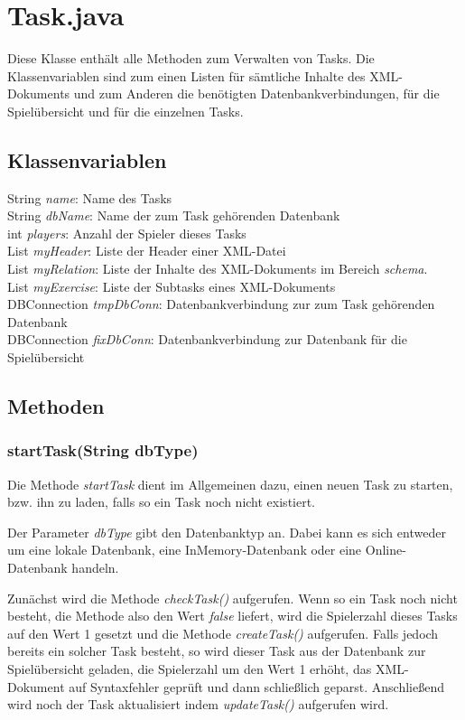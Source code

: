 \documentclass[11pt]{report}
\begin{document}
\section{Task.java}

Diese Klasse enthält alle Methoden zum Verwalten von Tasks. Die Klassenvariablen sind zum einen Listen für sämtliche Inhalte des XML-Dokuments und zum Anderen die benötigten Datenbankverbindungen, für die Spielübersicht und für die einzelnen Tasks.

\subsection*{Klassenvariablen}
String \textit{name}: Name des Tasks \\
String \textit{dbName}: Name der zum Task gehörenden Datenbank \\
int \textit{players}: Anzahl der Spieler dieses Tasks \\
List \textit{myHeader}: Liste der Header einer XML-Datei \\
List \textit{myRelation}: Liste der Inhalte des XML-Dokuments im Bereich \textit{schema}. \\
List \textit{myExercise}: Liste der Subtasks eines XML-Dokuments \\
DBConnection \textit{tmpDbConn}: Datenbankverbindung zur zum Task gehörenden Datenbank \\
DBConnection \textit{fixDbConn}: Datenbankverbindung zur Datenbank für die Spielübersicht

\subsection*{Methoden}

\subsubsection*{startTask(String dbType)}	

Die Methode \textit{startTask} dient im Allgemeinen dazu, einen neuen Task zu starten, bzw. ihn zu laden, falls so ein Task noch nicht existiert.

Der Parameter \textit{dbType} gibt den Datenbanktyp an. Dabei kann es sich entweder um eine lokale Datenbank, eine InMemory-Datenbank oder eine Online-Datenbank handeln.

Zunächst wird die Methode \textit{checkTask()} aufgerufen. Wenn so ein Task noch nicht besteht, die Methode also den Wert \textit{false} liefert, wird die Spielerzahl dieses Tasks auf den Wert 1 gesetzt und die Methode \textit{createTask()} aufgerufen. Falls jedoch bereits ein solcher Task besteht, so wird dieser Task aus der Datenbank zur Spielübersicht geladen, die Spielerzahl um den Wert 1 erhöht, das XML-Dokument auf Syntaxfehler geprüft und dann schließlich geparst. Anschließend wird noch der Task aktualisiert indem \textit{updateTask()} aufgerufen wird.
	
\end{document}

